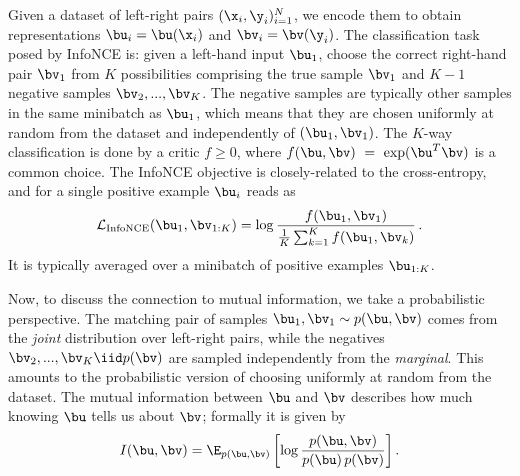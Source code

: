 Given a dataset of left-right pairs $(\x_i, \y_i)_{i=1}^N$, we encode them to obtain representations $\bu_i = \bu(\x_i)$ and $\bv_i = \bv(\y_i)$. 
The classification task posed by InfoNCE is: given a left-hand input $\bu_1$, choose the correct right-hand pair $\bv_1$ from $K$ possibilities comprising the true sample $\bv_1$ and $K-1$ negative samples $\bv_2, ..., \bv_K$.
The negative samples are typically other samples in the same minibatch as $\bu_1$, which means that they are chosen uniformly at random from the dataset and independently of $(\bu_1, \bv_1)$.
The $K$-way classification is done by a critic $f \ge 0$, where $f(\bu, \bv)~=~\exp(\bu^T\bv)$ is a common choice. The InfoNCE objective is closely-related to the cross-entropy, and for a single positive example $\bu_i$ reads as
\begin{equation}
\mathcal{L}_\text{InfoNCE}(\bu_1,\bv_{1:K}) = \log  \frac{f(\bu_1, \bv_1)}{\frac{1}{K}\sum_{k=1}^K f(\bu_1, \bv_k)}\,.
\end{equation}
It is typically averaged over a minibatch of positive examples $\bu_{1:K}$.

Now, to discuss the connection to mutual information, we take a probabilistic perspective.
The matching pair of samples $\bu_1, \bv_1 \sim p(\bu, \bv)$ comes from the \textit{joint} distribution over left-right pairs, while the negatives $\bv_2, ..., \bv_K \iid p(\bv)$ are sampled independently from the \textit{marginal}.
This amounts to the probabilistic version of choosing uniformly at random from the dataset.
The mutual information between $\bu$ and $\bv$ describes how much knowing $\bu$ tells us about $\bv$; formally it is given by
\begin{equation}
I(\bu,\bv) = \E_{p(\bu,\bv)}\left[ \log \frac{p(\bu, \bv)}{p(\bu)\,p(\bv)} \right].
\end{equation}


